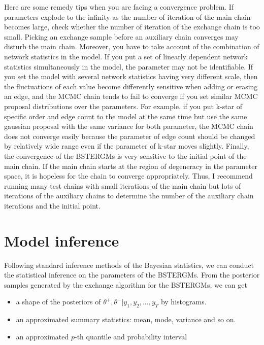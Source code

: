 \documentclass[a4paper, 11pt]{report}
\theoremstyle{definition}
\begin{document}
Here are some remedy tips when you are facing a convergence problem.
If parameters explode to the infinity as the number of iteration of the main chain becomes large, 
check whether the number of iteration of the exchange chain is too small. 
Picking an exchange sample before an auxiliary chain converges may disturb the main chain. 
Moreover, you have to take account of the combination of network statistics in the model. 
If you put a set of linearly dependent network statistics simultaneously in the model, 
the parameter may not be identifiable. 
If you set the model with several network statistics having very different scale,
then the fluctuations of each value become differently sensitive when adding or erasing an edge, 
and the MCMC chain tends to fail to converge if you set similar MCMC proposal distributions over the parameters.
For example, if you put k-star of specific order and edge count to the model at the same time 
but use the same gaussian proposal with the same variance for both parameter, 
the MCMC chain does not converge easily because the parameter of edge count should be changed by relatively wide range 
even if the parameter of k-star moves slightly. 
Finally, the convergence of the BSTERGMs is very sensitive to the initial point of the main chain. 
If the main chain starts at the region of degeneracy in the parameter space, 
it is hopeless for the chain to converge appropriately.
Thus, I recommend running many test chains with small iterations of the main chain 
but lots of iterations of the auxiliary chains 
to determine the number of the auxiliary chain iterations and the initial point.


\section{Model inference}

Following standard inference methods of the Bayesian statistics,
we can conduct the statistical inference on the parameters of the BSTERGMs.
From the posterior samples generated by the exchange algorithm for the BSTERGMs, we can get
\begin{itemize}
    \item a shape of the posteriors of $\theta^+,\theta^-|y_1,y_2,...,y_T$ by histograms.
    \item an approximated summary statistics: mean, mode, variance and so on.
    \item an approximated $p$-th quantile and probability interval
\end{itemize}
\end{document}
